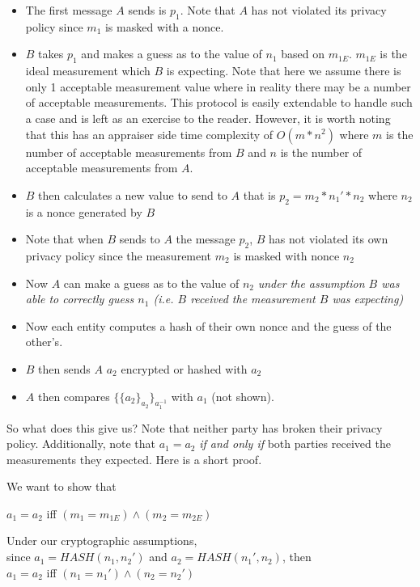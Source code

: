 \documentclass[10pt,a4paper,tikz]{article}
\begin{document}
\begin{itemize}
\item The first message $A$ sends is $p_1$. Note that $A$ has not violated its privacy policy since $m_1$ is masked with a nonce. 
\item $B$ takes $p_1$ and makes a guess as to the value of $n_1$ based on $m_{1E}$. $m_{1E}$ is the ideal measurement which $B$ is expecting. Note that here we assume there is only 1 acceptable measurement value where in reality there may be a number of acceptable measurements. This protocol is easily extendable to handle such a case and is left as an exercise to the reader. However, it is worth noting that this has an appraiser side time complexity of $O(m * n^2)$ where $m$ is the number of acceptable measurements from $B$ and $n$ is the number of acceptable measurements from $A$.
\item $B$ then calculates a new value to send to $A$ that is $p_2 = m_2*n_1'*n_2$ where $n_2$ is a nonce generated by $B$
\item Note that when $B$ sends to $A$ the message $p_2$, $B$ has not violated its own privacy policy since the measurement $m_2$ is masked with nonce $n_2$
\item Now $A$ can make a guess as to the value of $n_2$ \textit{under the assumption $B$ was able to correctly guess $n_1$ (i.e. $B$ received the measurement $B$ was expecting)}
\item Now each entity computes a hash of their own nonce and the guess of the other's.
\item $B$ then sends $A$ $a_2$ encrypted or hashed with $a_2$
\item $A$ then compares $\{\{a_2\}_{a_2}\}_{a_1^{-1}}$ with $a_1$ (not shown).
\end{itemize}

So what does this give us? Note that neither party has broken their privacy policy. Additionally, note that $a_1 = a_2$ \textit{if and only if} both parties received the measurements they expected. Here is a short proof. 

We want to show that
\begin{center}
$a_1 = a_2$  iff $(m_1 = m_{1E}) \land (m_2 = m_{2E})$
\end{center}
Under our cryptographic assumptions,\\ since $a_1 = HASH(n_1,n_2')$ and $a_2 = HASH(n_1',n_2)$, then \\ $a_1 = a_2$ iff $(n_1 = n_1') \land (n_2 = n_2')$
\end{document}
